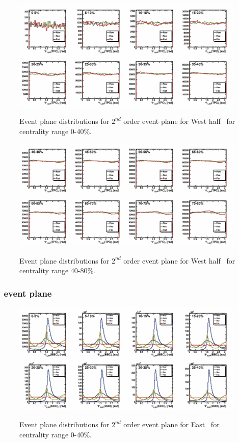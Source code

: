 \begin{figure}[ht]
    \includegraphics[width=0.99\textwidth]{Figures/PsiWest_harm0_0.png}
    \label{fig:BBC_East_EP1}
    \caption{Event plane distributions for $2^{nd}$ order event plane for West half \TPC\ for centrality range 0-40\%.}
\end{figure}

\begin{figure}[ht]
    \includegraphics[width=0.99\textwidth]{Figures/PsiWest_harm0_1.png}
    \label{fig:BBC_East_EP2}
    \caption{Event plane distributions for $2^{nd}$ order event plane for West half \TPC\ for centrality range 40-80\%.}
\end{figure}

\FloatBarrier
\subsubsection{\BBC\ event plane}

\begin{figure}[ht]
    \includegraphics[width=0.99\textwidth]{Figures/PsiEast_harm1_0.png}
    \label{fig:BBC_East_EP1}
    \caption{Event plane distributions for $2^{nd}$ order event plane for East \BBC\ for centrality range 0-40\%.}
\end{figure}

